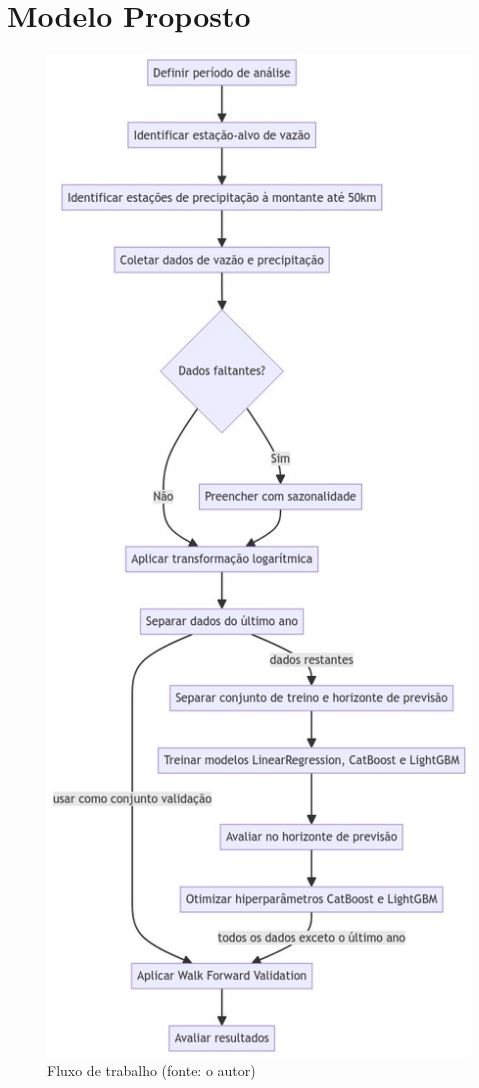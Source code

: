 \section{Modelo Proposto}
\begin{figure}[!h]
\centering
\includegraphics[scale=0.3]{Figuras/flowchart.png}
\caption{Fluxo de trabalho (fonte: o autor)}
\label{fig:fluxo_trabalho}
\end{figure}

